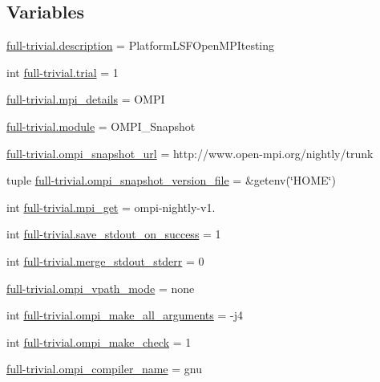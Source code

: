 \subsection*{Variables}
\begin{DoxyCompactItemize}
\item 
\hyperlink{namespacefull-trivial_ad3a7f6605e8fa1721ffb53150f1b1f2b}{full-\/trivial.\-description} = Platform\-L\-S\-F\-Open\-M\-P\-Itesting
\item 
int \hyperlink{namespacefull-trivial_a431381ca4d3ce0533b84fdf824145c45}{full-\/trivial.\-trial} = 1
\item 
\hyperlink{namespacefull-trivial_ac8c1b563f56da3a28444d9ba8c6e9cc9}{full-\/trivial.\-mpi\-\_\-details} = O\-M\-P\-I
\item 
\hyperlink{namespacefull-trivial_ac8f46360931db54c90bacdbeb7de743d}{full-\/trivial.\-module} = O\-M\-P\-I\-\_\-\-Snapshot
\item 
\hyperlink{namespacefull-trivial_ad99b4206b0691dff98229634af7de89e}{full-\/trivial.\-ompi\-\_\-snapshot\-\_\-url} = http\-://www.\-open-\/mpi.\-org/nightly/trunk
\item 
tuple \hyperlink{namespacefull-trivial_a8cb0b5677b37b7bb5ee95a14399ff9a3}{full-\/trivial.\-ompi\-\_\-snapshot\-\_\-version\-\_\-file} = \&getenv(\char`\"{}H\-O\-M\-E\char`\"{})
\item 
int \hyperlink{namespacefull-trivial_a27abf09427482f97a0072b3be7e6601d}{full-\/trivial.\-mpi\-\_\-get} = ompi-\/nightly-\/v1.
\item 
int \hyperlink{namespacefull-trivial_aa9f5860b95aa3cfb3deaa3cf840b5615}{full-\/trivial.\-save\-\_\-stdout\-\_\-on\-\_\-success} = 1
\item 
int \hyperlink{namespacefull-trivial_abffbc48fc37ad6d7010976ca874c845f}{full-\/trivial.\-merge\-\_\-stdout\-\_\-stderr} = 0
\item 
\hyperlink{namespacefull-trivial_a58c9dd08bbe532a5face257efa5cbd3e}{full-\/trivial.\-ompi\-\_\-vpath\-\_\-mode} = none
\item 
int \hyperlink{namespacefull-trivial_a5a973d684d1c8c9442df7cd698a3cd03}{full-\/trivial.\-ompi\-\_\-make\-\_\-all\-\_\-arguments} = -\/j4
\item 
int \hyperlink{namespacefull-trivial_a84b104cbca5b5b6e7d726de01ad3947f}{full-\/trivial.\-ompi\-\_\-make\-\_\-check} = 1
\item 
\hyperlink{namespacefull-trivial_ab1eddfc5389978f354d58c7637810d41}{full-\/trivial.\-ompi\-\_\-compiler\-\_\-name} = gnu
\item 

\end{DoxyCompactItemize}
